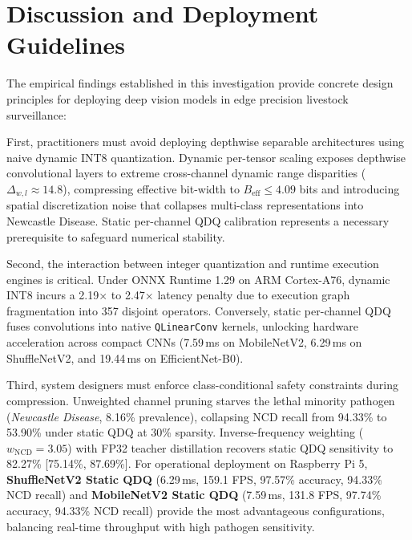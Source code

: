 \documentclass{jcse}
\begin{document}
\section{Discussion and Deployment Guidelines}The empirical findings established in this investigation provide concrete design principles for deploying deep vision models in edge precision livestock surveillance:

First, practitioners must avoid deploying depthwise separable architectures using naive dynamic INT8 quantization. Dynamic per-tensor scaling exposes depthwise convolutional layers to extreme cross-channel dynamic range disparities ($\Delta_{w,l} \approx 14.8$), compressing effective bit-width to $B_{\text{eff}} \le 4.09$ bits and introducing spatial discretization noise that collapses multi-class representations into Newcastle Disease. Static per-channel QDQ calibration represents a necessary prerequisite to safeguard numerical stability.

Second, the interaction between integer quantization and runtime execution engines is critical. Under ONNX Runtime 1.29 on ARM Cortex-A76, dynamic INT8 incurs a 2.19$\times$ to 2.47$\times$ latency penalty due to execution graph fragmentation into 357 disjoint operators. Conversely, static per-channel QDQ fuses convolutions into native \texttt{QLinearConv} kernels, unlocking hardware acceleration across compact CNNs (7.59\,ms on MobileNetV2, 6.29\,ms on ShuffleNetV2, and 19.44\,ms on EfficientNet-B0).

Third, system designers must enforce class-conditional safety constraints during compression. Unweighted channel pruning starves the lethal minority pathogen (\textit{Newcastle Disease}, 8.16\% prevalence), collapsing NCD recall from 94.33\% to 53.90\% under static QDQ at 30\% sparsity. Inverse-frequency weighting ($w_{\text{NCD}}=3.05$) with FP32 teacher distillation recovers static QDQ sensitivity to 82.27\% [75.14\%, 87.69\%]. For operational deployment on Raspberry Pi 5, \textbf{ShuffleNetV2 Static QDQ} (6.29\,ms, 159.1 FPS, 97.57\% accuracy, 94.33\% NCD recall) and \textbf{MobileNetV2 Static QDQ} (7.59\,ms, 131.8 FPS, 97.74\% accuracy, 94.33\% NCD recall) provide the most advantageous configurations, balancing real-time throughput with high pathogen sensitivity.
\end{document}
